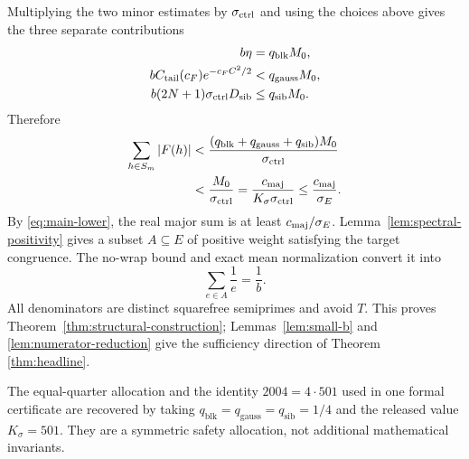 Multiplying the two minor estimates by $\sigma_{\mathrm{ctrl}}$ and using the choices above
gives the three separate contributions
\begin{align}
 b\eta&=q_{\mathrm{blk}}M_0,\label{eq:budget-block}\\
 bC_{\mathrm{tail}}(c_F)e^{-c_FC^2/2}
 &<q_{\mathrm{gauss}}M_0,\label{eq:budget-gauss}\\
 b(2N+1)\sigma_{\mathrm{ctrl}} D_{\mathrm{sib}}
 &\le q_{\mathrm{sib}}M_0.\label{eq:budget-sibling}
\end{align}
Therefore
\begin{align}
 \sum_{h\in S_m}|F(h)|
 &<\frac{(q_{\mathrm{blk}}+q_{\mathrm{gauss}}+q_{\mathrm{sib}})M_0}{\sigma_{\mathrm{ctrl}}}\\
 &<\frac{M_0}{\sigma_{\mathrm{ctrl}}}
 =\frac{c_{\mathrm{maj}}}{K_\sigma\sigma_{\mathrm{ctrl}}}
 \le\frac{c_{\mathrm{maj}}}{\sigma_E}.
 \label{eq:strict-minor}
\end{align}
By \eqref{eq:main-lower}, the real major sum is at least
$c_{\mathrm{maj}}/\sigma_E$.  Lemma~\ref{lem:spectral-positivity} gives a subset
$A\subseteq E$ of positive weight satisfying the target congruence.  The
no-wrap bound and exact mean normalization convert it into
\[
 \sum_{e\in A}\frac1e=\frac1b.
\]
All denominators are distinct squarefree semiprimes and avoid $T$.  This proves
Theorem~\ref{thm:structural-construction}; Lemmas~\ref{lem:small-b} and
\ref{lem:numerator-reduction} give the sufficiency direction of Theorem
\ref{thm:headline}.

The equal-quarter allocation and the identity $2004=4\cdot501$ used in one
formal certificate are recovered by taking
$q_{\mathrm{blk}}=q_{\mathrm{gauss}}=q_{\mathrm{sib}}=1/4$ and the released
value $K_\sigma=501$.  They are a symmetric safety allocation, not additional
mathematical invariants.
